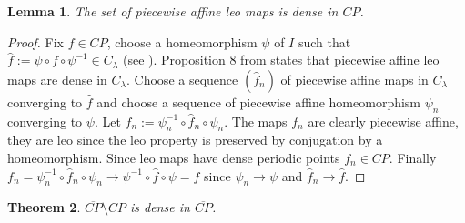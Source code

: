 \documentclass[12pt, a4paper]{amsart}
\newtheorem{theorem}{Theorem}[section]
\newtheorem{lemma}[theorem]{Lemma}
\newcommand{\?}{{\bf ???}}
\begin{document}
\begin{lemma}\label{l5'}The set of piecewise affine leo maps is dense in $CP$.\end{lemma}
\begin{proof} Fix $f \in CP$, choose a homeomorphism $\psi$ of $I$ such that $\hat{f} := \psi \circ f \circ \psi^{-1} \in C_{\lambda}$ (see \cite[p. 2] {BCOT}).
Proposition 8 from \cite{BT} states that piecewise affine leo maps are dense in $C_{\lambda}$.
Choose a sequence $(\hat{f}_n)$ of piecewise affine maps in  $C_{\lambda}$ converging to $\hat{f}$
and choose a sequence of piecewise affine homeomorphism $\psi_n$ converging to $\psi$.
Let $f_n :=  \psi_n^{-1} \circ \hat{f}_n \circ \psi_n$. The maps $f_n$ are clearly piecewise
affine, they are leo  since the leo property is preserved by  conjugation by a homeomorphism. Since leo maps have dense periodic points $f_n \in CP$.  Finally 
$f_n = \psi_n^{-1} \circ \hat{f}_n \circ \psi_n \to  \psi^{-1} \circ \hat f \circ \psi
= f$ since $\psi_n \to \psi$ and $\hat f_n \to \hat f$.
\end{proof}

\begin{theorem}\label{thm:CPclosurevsCP}
$\overline{CP}\setminus CP$ is dense in $\overline{CP}$.
\end{theorem}
\end{document}
